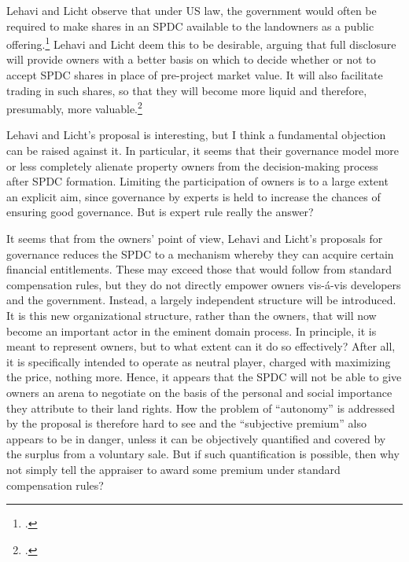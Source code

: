 Lehavi and Licht observe that under US law, the government would often be required to make shares in an SPDC available to the landowners as a public offering.\footcite[1745]{lehavi07} Lehavi and Licht deem this to be desirable, arguing that full disclosure will provide owners with a better basis on which to decide whether or not to accept SPDC shares in place of pre-project market value. It will also facilitate trading in such shares, so that they will become more liquid and therefore, presumably, more valuable.\footcite[1746]{lehavi06} 

Lehavi and Licht's proposal is interesting, but I think a fundamental objection can be raised against it. In particular, it seems that their governance model more or less completely alienate property owners from the decision-making process after SPDC formation. Limiting the participation of owners is to a large extent an explicit aim, since governance by experts is held to increase the chances of ensuring good governance. But is expert rule really the answer?

It seems that from the owners' point of view, Lehavi and Licht's proposals for governance reduces the SPDC to a mechanism whereby they can acquire certain financial entitlements. These may exceed those that would follow from standard compensation rules, but they do not directly empower owners vis-{\'a}-vis developers and the government. Instead, a largely independent structure will be introduced. It is this new organizational structure, rather than the owners, that will now become an important actor in the eminent domain process. In principle, it is meant to represent owners, but to what extent can it do so effectively? After all, it is specifically intended to operate as neutral player, charged with maximizing the price, nothing more. Hence, it appears that the SPDC will not be able to give owners an arena to negotiate on the basis of the personal and social importance they attribute to their land rights. How the problem of ``autonomy'' is addressed by the proposal is therefore hard to see and the ``subjective premium'' also appears to be in danger, unless it can be objectively quantified and covered by the surplus from a voluntary sale. But if such quantification is possible, then why not simply tell the appraiser to award some premium under standard compensation rules?


